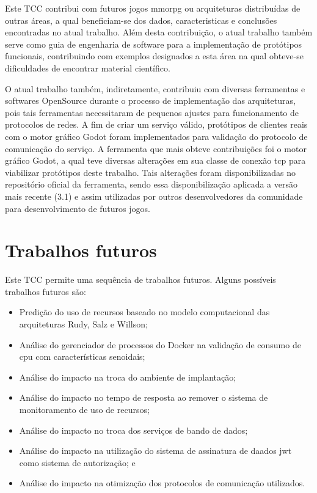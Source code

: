 Este TCC contribui com futuros jogos \ac{mmorpg} ou arquiteturas distribuídas de outras áreas, a qual beneficiam-se dos dados, caracteristicas e conclusões encontradas no atual trabalho.
%
Além desta contribuição, o atual trabalho também serve como guia de engenharia de software para a implementação de protótipos funcionais, contribuindo com exemplos designados a esta área na qual obteve-se dificuldades de encontrar material científico.

O atual trabalho também, indiretamente, contribuiu com diversas ferramentas e softwares OpenSource durante o processo de implementação das arquiteturas, pois tais ferramentas necessitaram de pequenos ajustes para funcionamento de protocolos de redes.
%
A fim de criar um serviço válido, protótipos de clientes reais com o motor gráfico Godot foram implementados para validação do protocolo de comunicação do serviço.
%
A ferramenta que mais obteve contribuições foi o motor gráfico Godot, a qual teve diversas alterações em sua classe de conexão \ac{tcp} para viabilizar protótipos deste trabalho.
%
Tais alterações foram disponibilizadas no repositório oficial da ferramenta, sendo essa disponibilização aplicada a versão mais recente (3.1) e assim utilizadas por outros desenvolvedores da comunidade para desenvolvimento de futuros jogos.




\section{Trabalhos futuros}

Este TCC permite uma sequência de trabalhos futuros.
%
Alguns possíveis trabalhos futuros são:

\begin{itemize}
 \item Predição do uso de recursos baseado no modelo computacional das arquiteturas Rudy, Salz e Willson;
 \item Análise do gerenciador de processos do Docker na validação de consumo de \ac{cpu} com características senoidais;
 \item Análise do impacto na troca do ambiente de implantação;
 \item Análise do impacto no tempo de resposta ao remover o sistema de monitoramento de uso de recursos;
 \item Análise do impacto no troca dos serviços de bando de dados;
 \item Análise do impacto na utilização do sistema de assinatura de daados \ac{jwt} como sistema de autorização; e
 \item Análise do impacto na otimização dos protocolos de comunicação utilizados.
\end{itemize}
